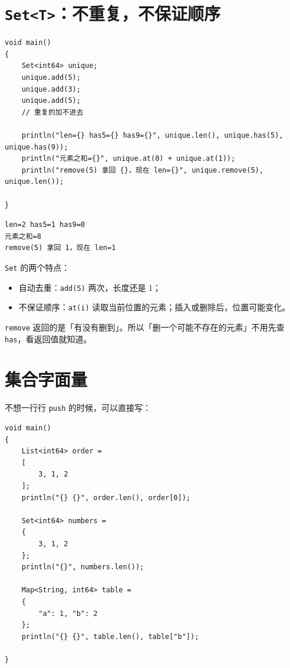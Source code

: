 \section{\texttt{Set<\allowbreak{}T>\allowbreak{}}：不重复，不保证顺序}

\par
\medskip
\begin{lstlisting}[style=chali]
void main()
{
    Set<int64> unique;
    unique.add(5);
    unique.add(3);
    unique.add(5);
    // 重复的加不进去

    println("len={} has5={} has9={}", unique.len(), unique.has(5), unique.has(9));
    println("元素之和={}", unique.at(0) + unique.at(1));
    println("remove(5) 拿回 {}，现在 len={}", unique.remove(5), unique.len());

}
\end{lstlisting}
\par
\medskip

\par
\medskip
\begin{lstlisting}[style=out]
len=2 has5=1 has9=0
元素之和=8
remove(5) 拿回 1，现在 len=1
\end{lstlisting}
\par
\medskip

\texttt{Set} 的两个特点：

\begin{itemize}

\item 自动去重：\texttt{add(\allowbreak{}5)\allowbreak{}} 两次，长度还是 1；

\item 不保证顺序：\texttt{at(\allowbreak{}i)\allowbreak{}} 读取当前位置的元素；插入或删除后，位置可能变化。

\end{itemize}

\texttt{remove} 返回的是「有没有删到」。所以「删一个可能不存在的元素」不用先查\texttt{has}，看返回值就知道。

\section{集合字面量}

不想一行行 \texttt{push} 的时候，可以直接写：

\par
\medskip
\begin{lstlisting}[style=chali]
void main()
{
    List<int64> order =
    [
        3, 1, 2
    ];
    println("{} {}", order.len(), order[0]);

    Set<int64> numbers =
    {
        3, 1, 2
    };
    println("{}", numbers.len());

    Map<String, int64> table =
    {
        "a": 1, "b": 2
    };
    println("{} {}", table.len(), table["b"]);

}
\end{lstlisting}
\par
\medskip

